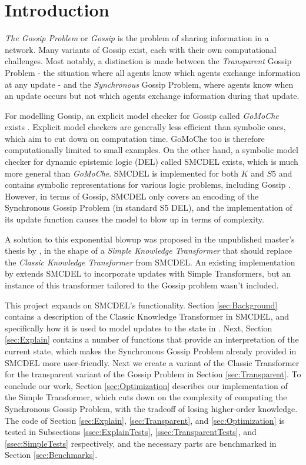 \section{Introduction}

\textit{The Gossip Problem} or \textit{Gossip} is the problem of sharing information in a network. 
Many variants of Gossip exist, each with their own computational challenges. 
Most notably, a distinction is made between the \textit{Transparent} Gossip Problem - the situation where all agents know 
which agents exchange information at any update - and the \textit{Synchronous} Gossip Problem, where agents know when an 
update occurs but not which agents exchange information during that update.

For modelling Gossip, an explicit model checker for Gossip called \textit{GoMoChe} exists \cite{gattinger2023gomoche}. 
Explicit model checkers are generally less efficient than symbolic ones, which aim to cut down on computation time. 
GoMoChe too is therefore computationally limited to small examples. On the other hand, 
a symbolic model checker for dynamic epistemic logic (DEL) called SMCDEL exists, which is much more general than \textit{GoMoChe}. 
SMCDEL is implemented for
both $K$ and $S5$ and contains symbolic representations for various logic problems, including Gossip \cite{GattingerThesis2018}. 
However, in terms of Gossip, SMCDEL only covers an encoding of the Synchronous Gossip 
Problem (in standard S5 DEL), and the implementation of its update function causes the model to blow up in terms of 
complexity.

A solution to this exponential blowup was proposed in the unpublished master's thesis by \cite{danielMasterThesis}, in the shape 
of a \textit{Simple Knowledge Transformer} that should replace the \textit{Classic Knowledge Transformer} from SMCDEL. An existing 
implementation by \cite{HaitianHanabi} extends SMCDEL to incorporate updates with Simple Transformers, but an instance of this transformer
tailored to the Gossip problem wasn't included. 

This project expands on SMCDEL's functionality. Section \ref{sec:Background} contains a description of 
the Classic Knowledge Transformer in SMCDEL, and 
specifically how it is used to model updates to the state in \cite{GattingerThesis2018}. 
Next, Section \ref{sec:Explain} contains a number of functions that provide an interpretation of the current state, 
which makes the Synchronous Gossip Problem already provided in SMCDEL more user-friendly. 
Next we create a variant of the Classic Transformer for the transparent variant of the Gossip Problem in Section \ref{sec:Transparent}. 
To conclude our work, Section \ref{sec:Optimization} describes our implementation of the Simple Transformer, 
which cuts down on the complexity of computing the Synchronous Gossip Problem, with the tradeoff of losing higher-order knowledge. 
The code of Section \ref{sec:Explain}, \ref{sec:Transparent}, and \ref{sec:Optimization} is tested in Subsections \ref{ssec:ExplainTests}, 
\ref{ssec:TransparentTests}, and \ref{ssec:SimpleTests} respectively, and the necessary parts are benchmarked in Section \ref{sec:Benchmarks}.
